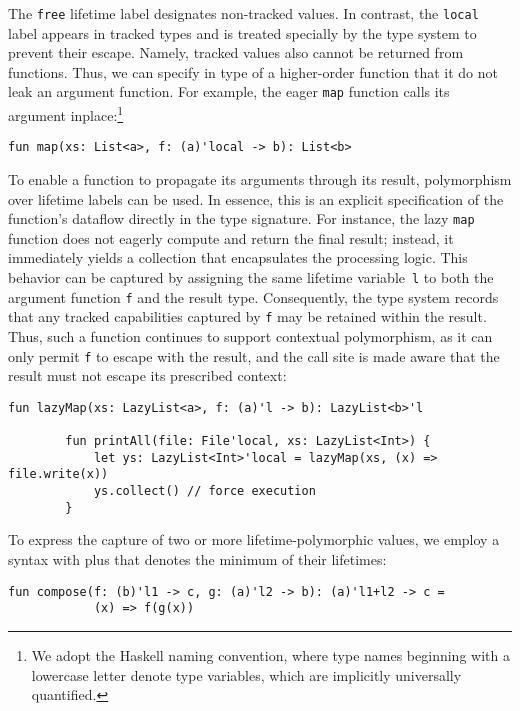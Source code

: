 \documentclass[11pt]{article}
\begin{document}
    The \lstinline[language=colang]|free| lifetime label designates non-tracked values.
    In contrast, the \lstinline[language=colang]|local| label appears in tracked types and is treated specially by the type system to prevent their escape.
    Namely, tracked values also cannot be returned from functions.
    Thus, we can specify in type of a higher-order function that it do not leak an argument function.
    For example, the eager \lstinline[language=colang]|map| function calls its argument inplace:\footnote{We adopt the Haskell naming convention, where type names beginning with a lowercase letter denote type variables, which are implicitly universally quantified.}
    \begin{lstlisting}[language=colang]
        fun map(xs: List<a>, f: (a)'local -> b): List<b>
    \end{lstlisting}

    To enable a function to propagate its arguments through its result, polymorphism over lifetime labels can be used.
    In essence, this is an explicit specification of the function’s dataflow directly in the type signature.
    For instance, the lazy \lstinline[language=colang]|map| function does not eagerly compute and return the final result; instead, it immediately yields a collection that encapsulates the processing logic.
    This behavior can be captured by assigning the same lifetime variable~\lstinline[language=colang]|l| to both the argument function \lstinline[language=colang]|f| and the result type.
    Consequently, the type system records that any tracked capabilities captured by \lstinline[language=colang]|f| may be retained within the result.
    Thus, such a function continues to support contextual polymorphism, as it can only permit \texttt{f} to escape with the result, and the call site is made aware that the result must not escape its prescribed context:
    \begin{lstlisting}[language=colang]
        fun lazyMap(xs: LazyList<a>, f: (a)'l -> b): LazyList<b>'l

        fun printAll(file: File'local, xs: LazyList<Int>) {
            let ys: LazyList<Int>'local = lazyMap(xs, (x) => file.write(x))
            ys.collect() // force execution
        }
    \end{lstlisting}

    To express the capture of two or more lifetime-polymorphic values, we employ a syntax with plus that denotes the minimum of their lifetimes:
    \begin{lstlisting}[language=colang]
        fun compose(f: (b)'l1 -> c, g: (a)'l2 -> b): (a)'l1+l2 -> c =
            (x) => f(g(x))
    \end{lstlisting}
\end{document}
